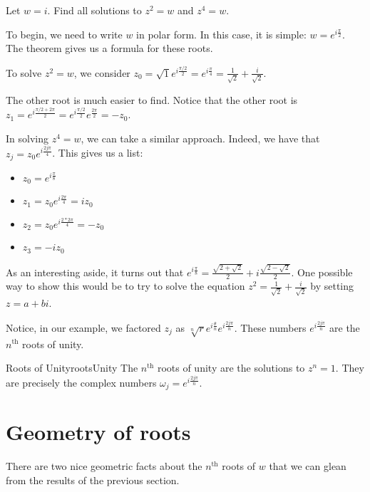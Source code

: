 \begin{ex}{}{} Let $w = i$. Find all solutions to $z^2 = w$ and $z^4 = w$.


To begin, we need to write $w$ in polar form. In this case, it is simple: $w = e^{i\frac{\pi}{2}}$. The theorem gives us a formula for these roots.

To solve $z^2 = w$, we consider $z_0 = \sqrt{1}e^{i\frac{\pi/2}{2}} = e^{i\frac{\pi}{4}} = \frac{1}{\sqrt{2}} + \frac{i}{\sqrt{2}}$.

The other root is much easier to find. Notice that the other root is $z_1 = e^{i\frac{\pi/2 + 2\pi}{2}} = e^{i\frac{\pi/2}{2}}e^{\frac{2\pi}{2}} = -z_0$.

In solving $z^4 = w$, we can take a similar approach. Indeed, we have that $z_j = z_0e^{i\frac{2j\pi}{4}}$. This gives us a list:

\begin{itemize}
\item $z_0 = e^{i\frac{\pi}{8}}$
\item $z_1 = z_0e^{i\frac{2\pi}{4}} = iz_0$
\item $z_2 = z_0e^{i\frac{2*2\pi}{4}}= -z_0$
\item $z_3 = -iz_0$
\end{itemize}

As an interesting aside, it turns out that $e^{i\frac{\pi}{8}} = \frac{\sqrt{2 + \sqrt{2}}}{2} + i\frac{\sqrt{2 - \sqrt{2}}}{2}$. One possible way to show this would be to try to solve the equation $z^2 = \frac{1}{\sqrt{2}} + \frac{i}{\sqrt{2}}$ by setting $z = a + bi$.
\end{ex}

Notice, in our example, we factored $z_j$ as $\sqrt[n]{r}e^{i\frac{\theta}{n}}e^{i\frac{2j\pi}{n}}$. These numbers $e^{i\frac{2j\pi}{n}}$ are the $n^{\text{th}}$ roots of unity.

\begin{defbo}{Roots of Unity}{rootsUnity}
The $n^{\text{th}}$ roots of unity are the solutions to $z^n = 1$. They are precisely the complex numbers $\omega_j = e^{i\frac{2j\pi}{n}}$.
\end{defbo}

\section{Geometry of roots}

There are two nice geometric facts about the $n^{\text{th}}$ roots of $w$ that we can glean from the results of the previous section.


